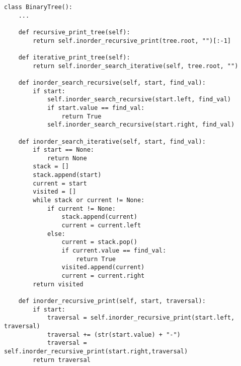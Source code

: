 \begin{lstlisting}[firstnumber=1, caption={Recursive and iterative implementation of in-order traversal.}]
class BinaryTree():
	...

	def recursive_print_tree(self):
		return self.inorder_recursive_print(tree.root, "")[:-1]
	
	def iterative_print_tree(self):
		return self.inorder_search_iterative(self, tree.root, "")

	def inorder_search_recursive(self, start, find_val):
		if start:
			self.inorder_search_recursive(start.left, find_val)
			if start.value == find_val:
				return True
			self.inorder_search_recursive(start.right, find_val)

	def inorder_search_iterative(self, start, find_val):
		if start == None:
			return None
		stack = []
		stack.append(start)
		current = start
		visited = []
		while stack or current != None:
			if current != None:
				stack.append(current)
				current = current.left
			else:
				current = stack.pop()
				if current.value == find_val:
					return True
				visited.append(current)
				current = current.right
		return visited		
		
	def inorder_recursive_print(self, start, traversal):
		if start:
			traversal = self.inorder_recursive_print(start.left, traversal)
			traversal += (str(start.value) + "-")
			traversal = self.inorder_recursive_print(start.right,traversal)
		return traversal
\end{lstlisting}

